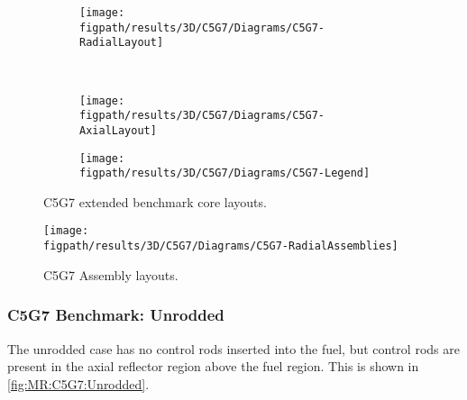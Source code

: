 {{{      \begin{figure}[htbp]
        \centering
        \begin{subfigure}[t]{0.45\textwidth}
          \centering
          \texttt{[image: \\figpath/results/3D/C5G7/Diagrams/C5G7-RadialLayout]}
        \end{subfigure}%
        ~
        \begin{subfigure}[t]{0.45\textwidth}
          \centering
          \texttt{[image: \\figpath/results/3D/C5G7/Diagrams/C5G7-AxialLayout]}
        \end{subfigure}
        \begin{subfigure}[t]{0.65\textwidth}
          \centering
          \texttt{[image: \\figpath/results/3D/C5G7/Diagrams/C5G7-Legend]}
        \end{subfigure}
        \caption{C5G7 extended benchmark core layouts. \label{figs:MR:C5G7:Layout}}
      \end{figure}

      \begin{figure}[htbp]
        \centering
        \texttt{[image: \\figpath/results/3D/C5G7/Diagrams/C5G7-RadialAssemblies]}
        \caption{C5G7 Assembly layouts.\label{fig:MR:C5G7:RadialAssemblyLayout}}
      \end{figure}






      \subsubsection{C5G7 Benchmark: Unrodded}{\label{sssec:MR:C5G7:Unrodded}
        The unrodded case has no control rods inserted into the fuel, but control rods are present in the axial reflector region above the fuel region.
        This is shown in \cref{fig:MR:C5G7:Unrodded}.

}}}}
